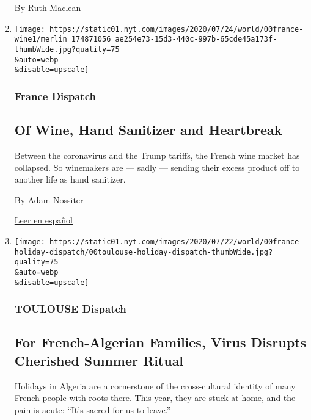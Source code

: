 \begin{enumerate}
  By Ruth Maclean
\item
  \href{/2020/07/27/world/europe/france-alsace-wine-coronavirus.html}{}

  \texttt{[image: https://static01.nyt.com/images/2020/07/24/world/00france-wine1/merlin\_174871056\_ae254e73-15d3-440c-997b-65cde45a173f-thumbWide.jpg?quality=75\\\&auto=webp\\\&disable=upscale]}

  \hypertarget{france-dispatch}{%
  \subsubsection{France Dispatch}\label{france-dispatch}}

  \hypertarget{of-wine-hand-sanitizer-and-heartbreak}{%
  \subsection{Of Wine, Hand Sanitizer and
  Heartbreak}\label{of-wine-hand-sanitizer-and-heartbreak}}

  Between the coronavirus and the Trump tariffs, the French wine market
  has collapsed. So winemakers are --- sadly --- sending their excess
  product off to another life as hand sanitizer.

  By Adam Nossiter

  \href{https://www.nytimes.com/es/2020/07/28/espanol/mundo/vino-blanco-alsacia-coronavirus.html}{Leer
  en español}
\item
  \href{/2020/07/26/world/europe/france-algeria-summer-vacations.html}{}

  \texttt{[image: https://static01.nyt.com/images/2020/07/22/world/00france-holiday-dispatch/00toulouse-holiday-dispatch-thumbWide.jpg?quality=75\\\&auto=webp\\\&disable=upscale]}

  \hypertarget{toulouse-dispatch}{%
  \subsubsection{TOULOUSE Dispatch}\label{toulouse-dispatch}}

  \hypertarget{for-french-algerian-families-virus-disrupts-cherished-summer-ritual}{%
  \subsection{For French-Algerian Families, Virus Disrupts Cherished
  Summer
  Ritual}\label{for-french-algerian-families-virus-disrupts-cherished-summer-ritual}}

  Holidays in Algeria are a cornerstone of the cross-cultural identity
  of many French people with roots there. This year, they are stuck at
  home, and the pain is acute: ``It's sacred for us to leave.''


\end{enumerate}
